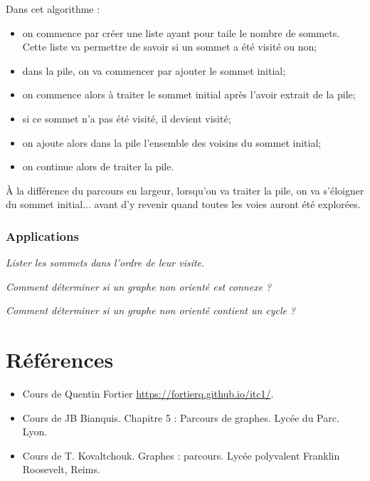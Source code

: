Dans cet algorithme : 
\begin{itemize}
\item on commence par créer une liste ayant pour taile le nombre de sommets. Cette liste va permettre de savoir si un sommet a été visité ou non;
\item dans la pile, on va commencer par ajouter le sommet initial;
\item on commence alors à traiter le sommet initial après l'avoir extrait de la pile;
\item si ce sommet n'a pas été visité, il devient visité;
\item on ajoute alors dans la pile l'ensemble des voisins du sommet initial;
\item on continue alors de traiter la pile. 
\end{itemize}
À la différence du parcours en largeur, lorsqu'on va traiter la pile, on va s'éloigner du sommet initial... avant d'y revenir quand toutes les voies auront été explorées. 

\subsubsection{Applications}
\begin{exemple}
\textit{Lister les sommets dans l'ordre de leur visite.}
\end{exemple}


\begin{exemple}
\textit{Comment déterminer si un graphe non orienté est connexe ?}
\end{exemple}


\begin{exemple}
\textit{Comment déterminer si un graphe non orienté contient un cycle ?}
\end{exemple}

\section*{Références}

\begin{itemize}
\item Cours de Quentin Fortier \url{https://fortierq.github.io/itc1/}.
\item Cours de JB Bianquis. Chapitre 5 : Parcours de graphes. Lycée du Parc. Lyon.
\item Cours de T. Kovaltchouk. Graphes : parcours. Lycée polyvalent Franklin Roosevelt, Reims.
\end{itemize}